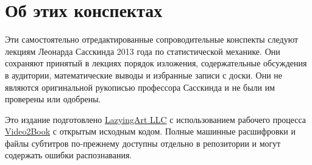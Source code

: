 \documentclass[11pt,oneside]{book}
\begin{document}
\frontmatter
\hypersetup{pageanchor=false}

\hypersetup{pageanchor=true}

\chapter*{Об этих конспектах}
Эти самостоятельно отредактированные сопроводительные конспекты следуют лекциям Леонарда Сасскинда 2013 года по статистической механике. Они сохраняют принятый в лекциях порядок изложения, содержательные обсуждения в аудитории, математические выводы и избранные записи с доски. Они не являются оригинальной рукописью профессора Сасскинда и не были им проверены или одобрены.

Это издание подготовлено \href{https://lazying.art}{LazyingArt LLC} с использованием рабочего процесса \href{https://github.com/lachlanchen/Video2Book}{Video2Book} с открытым исходным кодом. Полные машинные расшифровки и файлы субтитров по-прежнему доступны отдельно в репозитории и могут содержать ошибки распознавания.
\clearpage
\tableofcontents
\mainmatter










\end{document}
